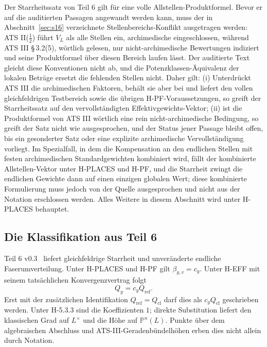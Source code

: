 \documentclass[11pt,a4paper]{article}
\theoremstyle{definition}
\theoremstyle{remark}
\begin{document}
Der Starrheitssatz von Teil 6 gilt für eine volle Allstellen-Produktformel.
Bevor er auf die auditierten Passagen angewandt werden kann, muss der in
Abschnitt~\ref{sec:s16} verzeichnete Stellenbereichs-Konflikt ausgetragen
werden: ATS II($\tfrac12$) führt $V_L$ als alle Stellen ein, archimedische
eingeschlossen, während ATS III \S\,3.2(5), wörtlich gelesen, nur
nicht-archimedische Bewertungen indiziert und seine Produktformel über
diesen Bereich laufen lässt. Der auditierte Text gleicht diese Konventionen
nicht ab, und die Potenzklassen-Äquivalenz der lokalen Beträge ersetzt die
fehlenden Stellen nicht. Daher gilt: (i) Unterdrückt ATS III die
archimedischen Faktoren, behält sie aber bei und liefert den vollen
gleichfeldrigen Testbereich sowie die übrigen H-PF-Voraussetzungen, so
greift der Starrheitssatz auf den vervollständigten Effektivgewichts-Vektor;
(ii) ist die Produktformel von ATS III wörtlich eine rein
nicht-archimedische Bedingung, so greift der Satz nicht wie ausgesprochen,
und der Status jener Passage bleibt offen, bis ein gesonderter Satz oder
eine explizite archimedische Vervollständigung vorliegt. Im Spezialfall, in
dem die Kompensation an den endlichen Stellen mit festen archimedischen
Standardgewichten kombiniert wird, fällt der kombinierte Allstellen-Vektor
unter H-PLACES und H-PF, und die Starrheit zwingt die endlichen Gewichte
dann auf einen einzigen globalen Wert; diese kombinierte Formulierung muss
jedoch von der Quelle ausgesprochen und nicht aus der Notation erschlossen
werden. Alles Weitere in diesem Abschnitt wird unter H-PLACES behauptet.

\subsection{Die Klassifikation aus Teil 6}

Teil 6 v0.3~\cite{part6} liefert gleichfeldrige Starrheit und
unveränderte endliche Faserumverteilung. Unter H-PLACES und H-PF gilt
$\beta_{y,v}=c_y$. Unter H-EFF mit seinem tatsächlichen Konvergenzvertrag
folgt
\[
 Q_y=c_y Q_{\mathrm{ref}}.
\]
Erst mit der zusätzlichen Identifikation $Q_{\mathrm{ref}}=Q_{\mathrm{cl}}$
darf dies als $c_yQ_{\mathrm{cl}}$ geschrieben werden. Unter H-5.3.3 sind
die Koeffizienten $1$; direkte Substitution liefert den klassischen Grad
auf $L^\times$ und die Höhe auf $\mathbb P^n(L)$. Punkte über dem
algebraischen Abschluss und ATS-III-Geradenbündelhöhen erben dies nicht
allein durch Notation.
\end{document}
